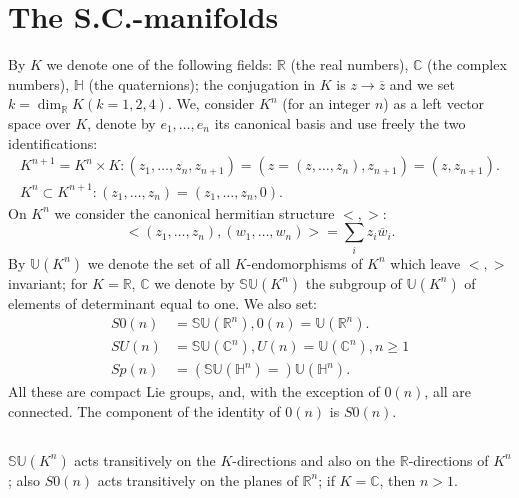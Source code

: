 \section{The S.C.-manifolds}\label{chap3:sec4}

\quad 
By $K$ we denote one of the following fields: $\mathbb{R}$ (the real
numbers), $\mathbb{C}$ (the complex numbers), $\mathbb{H}$ (the
quaternions); the conjugation in $K$ is $z\to \overline{z}$ and we set
$k=\dim_{\mathbb{R}} K(k=1,2,4)$. We, consider $K^{n}$ (for an integer
$n$) as a 
left vector space over $K$, denote by $e_{1},\ldots,e_{n}$ its
canonical basis and use freely the two identifications:
\begin{gather*}
K^{n+1}=K^{n}\times
K:(z_{1},\ldots,z_{n},z_{n+1})=(z=(z,\ldots,z_{n}),z_{n+1})=(z,z_{n+1}).\\
K^{n}\subset
K^{n+1}:(z_{1},\ldots,z_{n})=(z_{1},\ldots,z_{n},0).\tag{3.4.1}\label{chap3:3.4.1} 
\end{gather*}
On $K^{n}$ we consider the canonical hermitian structure $<,>$:
$$
<(z_{1},\ldots,z_{n}),(w_{1},\ldots,w_{n})>=\sum_{i}z_{i}\overline{w}_{i}.
$$
By $\mathbb{U}(K^{n})$ we denote the set of all $K$-endomorphisms of
$K^{n}$ which leave $<,>$ invariant; for $K=\mathbb{R}$, $\mathbb{C}$
we denote by $\mathbb{S}\mathbb{U}(K^{n})$ the subgroup of
$\mathbb{U}(K^{n})$ of elements of determinant equal to one. We also
set:
\begin{align*}
S0(n)&=\mathbb{S}\mathbb{U}(\mathbb{R}^{n}),0(n)=\mathbb{U}(\mathbb{R}^{n}).\tag{3.4.2}\label{chap3:3.4.2}\\
SU(n) &=
\mathbb{S}\mathbb{U}(\mathbb{C}^{n}),U(n)=\mathbb{U}(\mathbb{C}^{n}),n\geq
1\tag{3.4.2}\\
Sp(n) &= (\mathbb{S}\mathbb{U}(\mathbb{H}^{n})=)\mathbb{U}(\mathbb{H}^{n}).
\end{align*}\pageoriginale
All these are compact Lie groups, and, with the exception of $0(n)$,
all are connected. The component of the identity of $0(n)$ is $S0(n)$.

\setcounter{subsection}{2}

\subsection{}\label{chap3:3.4.3}

\begin{prop*}
$\mathbb{S}\mathbb{U}(K^{n})$ acts transitively on the $K$-directions
  and also on the $\mathbb{R}$-directions of $K^{n}$; also $S0(n)$
  acts transitively on the planes of $\mathbb{R}^{n}$; if
  $K=\mathbb{C}$, then $n>1$.
\end{prop*}

